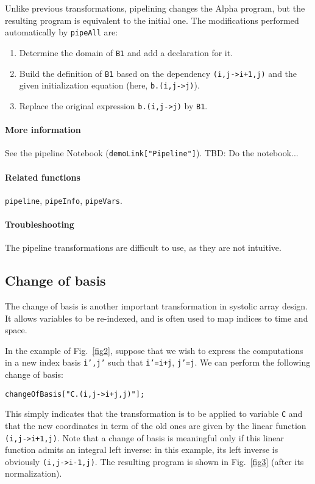 \documentclass[12pt]{article}
\newcommand{\Alpha}{{\sc Alpha}}
\begin{document}
Unlike previous transformations, pipelining changes the
{\Alpha} program, but the resulting program is equivalent to
the initial one. 
The modifications performed automatically by \texttt{pipeAll} are:
\begin{enumerate}
\item Determine the domain of {\tt B1} and add a
declaration for it.
\item Build the definition of {\tt B1} based on the dependency {\tt (i,j->i+1,j)} and the given initialization equation (here, {\tt b.(i,j->j)}).
\item Replace the original expression {\tt b.(i,j->j)} by {\tt B1}.
\end{enumerate}

\begin{tobedone}
\paragraph*{More information}
See the pipeline Notebook (\texttt{demoLink["Pipeline"]}).
TBD: Do the notebook...
\end{tobedone}

\paragraph*{Related functions}
\texttt{pipeline}, \texttt{pipeInfo}, \texttt{pipeVars}.

\paragraph*{Troubleshooting}
The pipeline transformations are difficult to use, as
they are not intuitive.

\subsection{Change of basis}
\label{cob}
The change of basis is another important transformation in systolic
array design. It allows variables to be re-indexed, and is often used
to map indices to time and space.

In the example of Fig.~\ref{fig2}, suppose that we wish to express
the computations in a new index basis {\tt i',j'} such that {\tt i'=i+j}, 
{\tt j'=j}. We can perform the following change of basis:
\begin{verbatim}
changeOfBasis["C.(i,j->i+j,j)"];
\end{verbatim}
This simply
indicates that the transformation is to be applied to variable {\tt C}
and that the new coordinates in term of the old ones are given by
the linear function \texttt{(i,j->i+1,j)}.
Note that a change of basis is meaningful only if
this linear function admits an integral left inverse: in this
example, its left inverse is obviously \texttt{(i,j->i-1,j)}. The
resulting program is shown in Fig.~\ref{fig3} (after its normalization).
\end{document}
